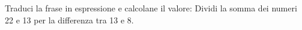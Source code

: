 \item Traduci la frase in espressione e calcolane il valore: Dividi la somma dei numeri 22 e 13 per la differenza tra 13 e 8.